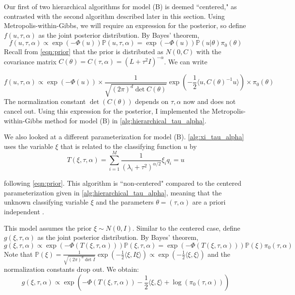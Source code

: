 \documentclass{siamart1116}
\begin{document}
Our first of two hierarchical algorithms for model (B) is deemed ``centered," as contrasted with the second algorithm described later in this section. Using Metropolis-within-Gibbs, we will require an expression for the posterior, so define $f(u,\tau,\alpha)$ as the joint posterior distribution. By Bayes' theorem, 
\[f(u,\tau,\alpha) \propto \exp(-\Phi(u))\mathbb{P}(u,\tau,\alpha) = \exp(-\Phi(u))\mathbb{P}(u|\theta)\pi_0(\theta)\]
Recall from \cref{eqn:prior} that the prior is distributed as $N(0, C)$ with the covariance matrix $C(\theta) = C(\tau, \alpha) = (L + \tau^2I)^{-\alpha}$. We can write

\begin{equation}
\label{eqn:centered_post}
f(u,\tau,\alpha) \propto \exp(-\Phi(u))\times \frac{1}{\sqrt{(2\pi)^d \det C(\theta)}} \exp\left(-\frac{1}{2}\langle u, C(\theta)^{-1}u  \rangle\right) \times \pi_0(\theta)
\end{equation}
The normalization constant $\det(C(\theta))$ depends on $\tau, \alpha$ now and does not cancel out. Using this expression for the posterior, I implemented the Metropolis-within-Gibbs method for model (B) in \cref{alg:hierarchical_tau_alpha}.


We also looked at a different parameterization for model (B). \cref{alg:xi_tau_alpha} uses the variable $\xi$ that is related to the classifying function $u$ by 
\begin{equation}
\label{eqn:noncentered_T}
T(\xi,\tau,\alpha) = \sum_{i=1}^M \frac{1}{(\lambda_i+\tau^2)^{\alpha/2}}\xi_iq_i = u
\end{equation}

following \cref{eqn:prior}. This algorithm is ``non-centered" compared to the centered parameterization given in \cref{alg:hierarchical_tau_alpha}, meaning that the unknown classifying variable $\xi$ and the parameters $\theta=(\tau,\alpha)$ are a priori independent \cite{Noncentered}.

This model assumes the prior $\xi \sim N(0,I)$. Similar to the centered case, define $g(\xi,\tau,\alpha)$ as the joint posterior distribution. By Bayes' theorem, 
\[g(\xi,\tau,\alpha) \propto \exp(-\Phi(T(\xi,\tau,\alpha)))\mathbb{P}(\xi,\tau,\alpha) = \exp(-\Phi(T(\xi,\tau,\alpha)))\mathbb{P}(\xi)\pi_0(\tau, \alpha)\]
Note that $\mathbb{P}(\xi) = \frac{1}{\sqrt{(2\pi)^d \det I}} \exp(-\frac{1}{2}\langle \xi, I\xi  \rangle) \propto \exp(-\frac{1}{2}\langle \xi,\xi \rangle)$ and the normalization constants drop out. We obtain:
\begin{equation}
\label{eqn:noncentered_post}
g(\xi,\tau,\alpha) \propto \exp\left( -\Phi(T(\xi,\tau,\alpha))-\frac{1}{2}\langle \xi,\xi \rangle + \log(\pi_0(\tau,\alpha)) \right)
\end{equation}
\end{document}
